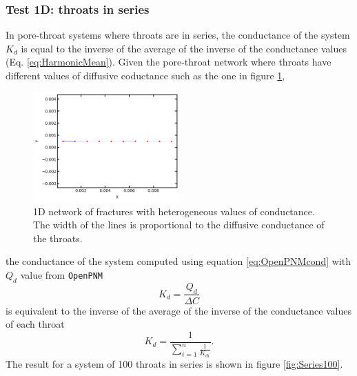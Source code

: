\documentclass{article}
\begin{document}
\subsubsection{Test 1D: throats in series}
In pore-throat systems where throats are in series, the conductance of the system $K_d$ is equal to the inverse of the average of the inverse of the conductance values (Eq. \ref{eq:HarmonicMean}). Given the pore-throat network where throats have different values of diffusive coductance such as the one in figure \ref{fig:Network1Dhet},
\begin{figure}[htbp]
    \centering
    \includegraphics[width=0.5\textwidth]{images/fromOpenPNM/hetNetwork1D.png}
    \caption{1D network of fractures with heterogeneous values of conductance. The width of the lines is proportional to the diffusive conductance of the throats.}
    \label{fig:Network1Dhet}
\end{figure}
the conductance of the system computed using equation \ref{eq:OpenPNMcond} with $Q_d$ value from \texttt{OpenPNM}
\begin{equation}
    K_d = \dfrac{Q_d}{\Delta C}
    \label{eq:OpenPNMcond}
\end{equation}
is equivalent to the inverse of the average of the inverse of the conductance values of each throat
\begin{equation}
    K_d = \frac{1}{\sum_{i=1}^n\frac{1}{K_{di}}}.
    \label{eq:HarmonicMean}
\end{equation}
The result for a system of 100 throats in series is shown in figure \ref{fig:Series100}.
\end{document}
